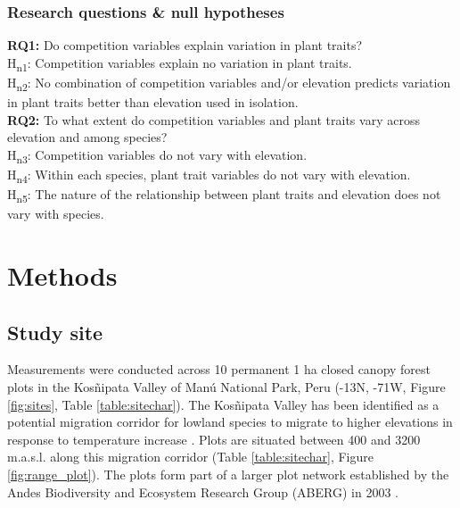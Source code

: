 \documentclass[a4paper,10pt,]{report}
\begin{document}
\clearpage
\subsection*{Research questions \& null hypotheses}
\textbf{RQ1:} Do competition variables explain variation in plant traits?\\
\vspace{3 mm}
H\textsubscript{n1}: Competition variables explain no variation in plant traits.\\
\vspace{2 mm}
H\textsubscript{n2}: No combination of competition variables and/or elevation predicts variation in plant traits better than elevation used in isolation.\\
\vspace{4 mm}
\textbf{RQ2:} To what extent do competition variables and plant traits vary across elevation and among species?\\
\vspace{3 mm}
H\textsubscript{n3}:  Competition variables do not vary with elevation.\\
\vspace{2 mm}
H\textsubscript{n4}:  Within each species, plant trait variables do not vary with elevation.\\
\vspace{2 mm}
H\textsubscript{n5}: The nature of the relationship between plant traits and elevation does not vary with species.\\

\chapter{Methods}
\section{Study site}
Measurements were conducted across 10 permanent 1 ha closed canopy forest plots in the Kos\~{n}ipata Valley of Man\'{u} National Park, Peru (-13\textdegree N, -71\textdegree W, Figure \ref{fig:sites}, Table \ref{table:sitechar}). The Kos\~{n}ipata Valley has been identified as a potential migration corridor for lowland species to migrate to higher elevations in response to temperature increase \citep{Feeley2011}. Plots are situated between 400 and 3200 m.a.s.l. along this migration corridor (Table \ref{table:sitechar}, Figure \ref{fig:range_plot}). The plots form part of a larger plot network established by the Andes Biodiversity and Ecosystem Research Group (ABERG) in 2003 \citep{Malhi2010, Girardin2013a}.
\end{document}
